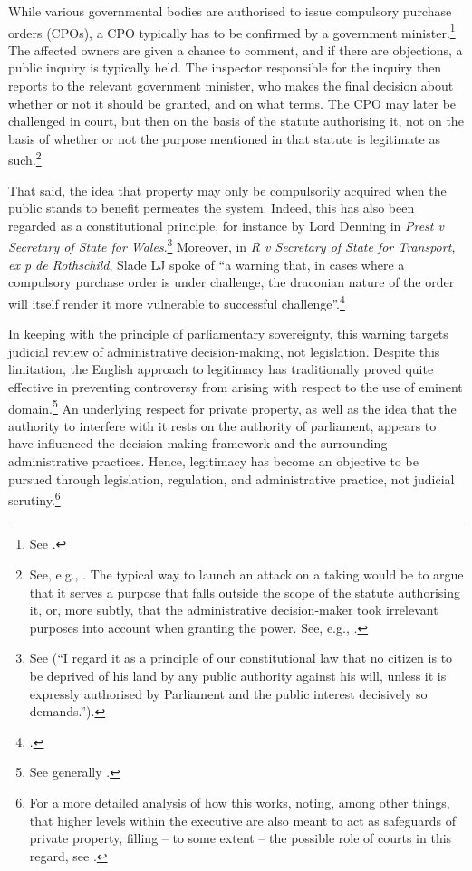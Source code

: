 While various governmental bodies are authorised to issue compulsory purchase orders (CPOs), a CPO typically has to be confirmed by a government minister.\footnote{See \cite[48]{waring09}.} The affected owners are given a chance to comment, and if there are objections, a public inquiry is typically held. The inspector responsible for the inquiry then reports to the relevant government minister, who makes the final decision about whether or not it should be granted, and on what terms. The CPO may later be challenged in court, but then on the basis of the statute authorising it, not on the basis of whether or not the purpose mentioned in that statute is legitimate as such.\footnote{See, e.g., \cite[48-49]{waring09}. The typical way to launch an attack on a taking would be to argue that it serves a purpose that falls outside the scope of the statute authorising it, or, more subtly, that the administrative decision-maker took irrelevant purposes into account when granting the power. See, e.g., \cite{sainsbury10}.} 

That said, the idea that property may only be compulsorily acquired when the public stands to benefit permeates the system. Indeed, this has also been regarded as a constitutional principle, for instance by Lord Denning in {\it Prest v Secretary of State for Wales}.\footnote{See \cite[198]{prest82} (``I regard it as a principle of our constitutional law that no citizen is to be deprived of his land by any public authority against his will, unless it is expressly authorised by Parliament and the public interest decisively so demands.'').} Moreover, in {\it R v Secretary of State for Transport, ex p de Rothschild}, Slade LJ spoke of ``a warning that, in cases where a compulsory purchase order is under challenge, the draconian nature of the order will itself render it more vulnerable to successful challenge''.\footcite[938]{rothschild89}

In keeping with the principle of parliamentary sovereignty, this warning targets judicial review of administrative decision-making, not legislation. Despite this limitation, the English approach to legitimacy has traditionally proved quite effective in preventing controversy from arising with respect to the use of eminent domain.\footnote{See generally \cite{allen10}.} An underlying respect for private property, as well as the idea that the authority to interfere with it rests on the authority of parliament, appears to have influenced the decision-making framework and the surrounding administrative practices. Hence, legitimacy has become an objective to be pursued through legislation, regulation, and administrative practice, not judicial scrutiny.\footnote{For a more detailed analysis of how this works, noting, among other things, that higher levels within the executive are also meant to act as safeguards of private property, filling -- to some extent -- the possible role of courts in this regard, see \cite[85-100]{allen08}.}

